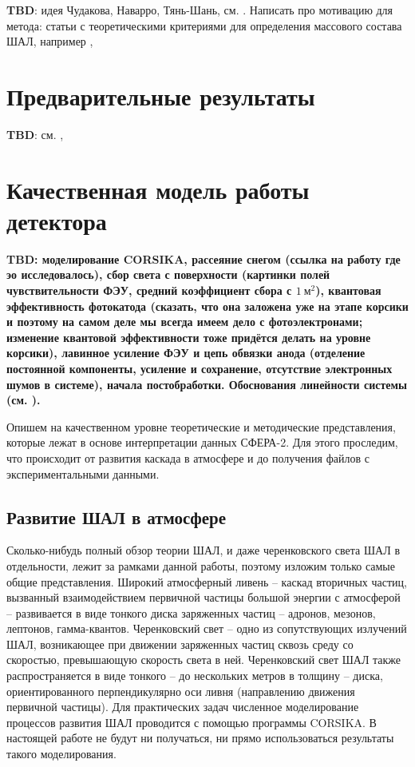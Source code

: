 \documentclass[12pt]{book}
\begin{document}
	\textbf{TBD}: идея Чудакова, Наварро, Тянь-Шань, см. \cite{chernov2015-overview}. Написать про мотивацию для метода: статьи с теоретическими критериями для определения массового состава ШАЛ, например \cite{Anokhina2007}, \cite{Chernov2017-ICRC}
	
	\section{Предварительные результаты}
	
	\textbf{TBD}: см. \cite{Antonov2013}, 

	\section{Качественная модель работы детектора}
	
	\textbf{\textbf{TBD}: моделирование CORSIKA, рассеяние снегом (ссылка на работу где эо исследовалось), сбор света с поверхности (картинки полей чувствительности ФЭУ, средний коэффициент сбора с $1~\text{м}^2$), квантовая эффективность фотокатода (сказать, что она заложена уже на этапе корсики и поэтому на самом деле мы всегда имеем дело с фотоэлектронами; изменение квантовой эффективности тоже придётся делать на уровне корсики), лавинное усиление ФЭУ и цепь обвязки анода (отделение постоянной компоненты, усиление и сохранение, отсутствие электронных шумов в системе), начала постобработки. Обоснования линейности системы (см. \cite{SphereCalibration2016}).}
	
	Опишем на качественном уровне теоретические и методические представления, которые лежат в основе интерпретации данных СФЕРА-2. Для этого проследим, что происходит от развития каскада в атмосфере и до получения файлов с экспериментальными данными.

	\subsection{Развитие ШАЛ в атмосфере}
		
	Сколько-нибудь полный обзор теории ШАЛ, и даже черенковского света ШАЛ в отдельности, лежит за рамками данной работы, поэтому изложим только самые общие представления. Широкий атмосферный ливень -- каскад вторичных частиц, вызванный взаимодействием первичной частицы большой энергии с атмосферой -- развивается в виде тонкого диска заряженных частиц -- адронов, мезонов, лептонов, гамма-квантов. Черенковский свет -- одно из сопутствующих излучений ШАЛ, возникающее при движении заряженных частиц сквозь среду со скоростью, превышающую скорость света в ней. Черенковский свет ШАЛ также распространяется в виде тонкого -- до нескольких метров в толщину -- диска, ориентированного перпендикулярно оси ливня (направлению движения первичной частицы). Для практических задач численное моделирование процессов развития ШАЛ проводится с помощью программы CORSIKA. В настоящей работе не будут ни получаться, ни прямо использоваться результаты такого моделирования.
	
\end{document}
